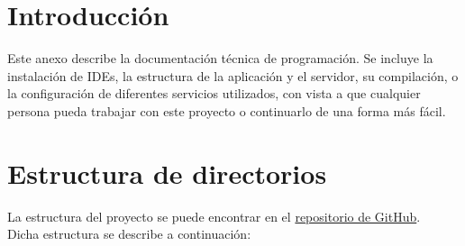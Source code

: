 
\section{Introducción}

Este anexo describe la documentación técnica de programación.
Se incluye la instalación de IDEs, la estructura de la aplicación y el servidor, su compilación, o la configuración de diferentes servicios utilizados, con vista a que cualquier persona pueda trabajar con este proyecto o continuarlo de una forma más fácil.



\section{Estructura de directorios}

La estructura del proyecto se puede encontrar en el \href{https://github.com/fmv1001/DomoCamera}{repositorio de GitHub}.\\
Dicha estructura se describe a continuación:

